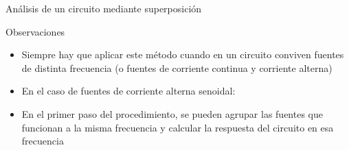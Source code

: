 \documentclass[aspectratio=169, usenames,svgnames,dvipsnames]{beamer}
\begin{document}
\begin{frame}{Análisis de un circuito mediante superposición}

    \begin{block}{Observaciones}
    \begin{itemize}
        \vspace{2mm}
        \item \alert{Siempre} hay que \alert{aplicar este método} cuando en un circuito conviven \alert{fuentes de distinta frecuencia} (o fuentes de corriente continua y corriente alterna)

        \vspace{2mm}
        \item En el caso de fuentes de \alert{corriente alterna senoidal}:

        \vspace{1mm}
        
        \vspace{2mm}
        \item En el primer paso del procedimiento, se pueden \alert{agrupar las fuentes que funcionan a la misma frecuencia} y calcular la respuesta del circuito en esa frecuencia

        \vspace{1mm}
    \end{itemize}
    \end{block}
\end{frame}

\end{document}
